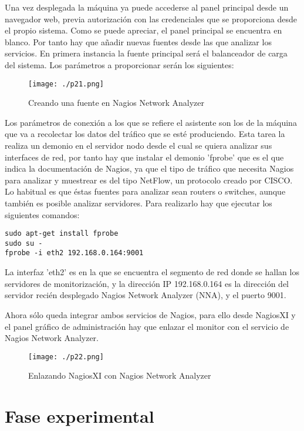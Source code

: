 \documentclass[paper=a4, fontsize=12pt]{scrartcl} %
\begin{document}
Una vez desplegada la máquina ya puede accederse al panel principal desde un navegador web, previa autorización con las credenciales que se proporciona desde el propio sistema.
Como se puede apreciar, el panel principal se encuentra en blanco. Por tanto hay que añadir nuevas fuentes desde las que analizar los servicios.
En primera instancia la fuente principal será el balanceador de carga del sistema. Los parámetros a proporcionar serán los siguientes:

\begin{figure}[H] %
	\centering
	\label{lsblk}
	\texttt{[image: ./p21.png]}
	\caption{Creando una fuente en Nagios Network Analyzer} 
\end{figure}

Los parámetros de conexión a los que se refiere el asistente son los de la máquina que va a recolectar los datos del tráfico que se esté produciendo. Esta tarea la realiza un demonio en el servidor nodo desde el cual se quiera analizar sus interfaces de red, por tanto hay que instalar el demonio 'fprobe' \cite{p7} que es el que indica la documentación de Nagios, ya que el tipo de tráfico que necesita Nagios para analizar y muestrear es del tipo NetFlow, un protocolo creado por CISCO.\cite{p9} Lo habitual es que éstas fuentes para analizar sean routers o switches, aunque también es posible analizar servidores. Para realizarlo hay que ejecutar los siguientes comandos:
\begin{lstlisting}
sudo apt-get install fprobe
sudo su -
fprobe -i eth2 192.168.0.164:9001
\end{lstlisting}

La interfaz 'eth2' es en la que se encuentra el segmento de red donde se hallan los servidores de monitorización, y la dirección IP 192.168.0.164 es la dirección del servidor recién desplegado Nagios Network Analyzer (NNA), y el puerto 9001. \cite{p8}

Ahora sólo queda integrar ambos servicios de Nagios, para ello desde NagiosXI y el panel gráfico de administración hay que enlazar el monitor con el servicio de Nagios Network Analyzer.

\begin{figure}[H] %
	\centering
	\label{lsblk}
	\texttt{[image: ./p22.png]}
	\caption{Enlazando NagiosXI con Nagios Network Analyzer} 
\end{figure}


\section{Fase experimental}
\end{document}
